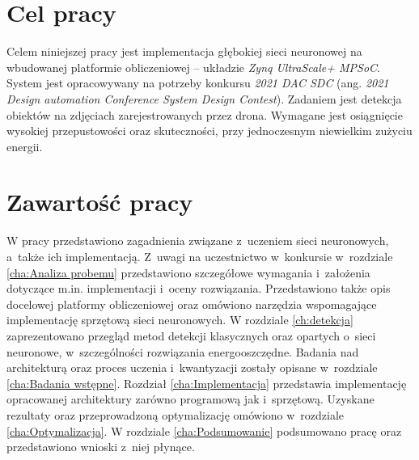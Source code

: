 \section{Cel pracy}
\label{sec:celePracy}
Celem niniejszej pracy jest implementacja głębokiej sieci neuronowej na wbudowanej platformie obliczeniowej -- układzie \emph{Zynq UltraScale+ MPSoC}.
System jest opracowywany na potrzeby konkursu \emph{2021 DAC SDC} (ang. \emph{ 2021 Design automation Conference System Design Contest}).
Zadaniem jest detekcja obiektów na zdjęciach zarejestrowanych przez drona. 
Wymagane jest osiągnięcie wysokiej przepustowości oraz skuteczności, przy jednoczesnym niewielkim zużyciu energii. 


\section{Zawartość pracy}
\label{sec:zawartoscPracy}
W pracy przedstawiono zagadnienia związane z~uczeniem sieci neuronowych, a~także ich implementacją. 
Z~uwagi na uczestnictwo w~konkursie w~rozdziale \ref{cha:Analiza probemu} przedstawiono szczegółowe wymagania i~założenia dotyczące m.in. implementacji i~oceny rozwiązania. 
Przedstawiono także opis docelowej platformy obliczeniowej oraz omówiono narzędzia wspomagające implementację sprzętową sieci neuronowych.
W rozdziale \ref{ch:detekcja} zaprezentowano przegląd metod detekcji klasycznych oraz opartych o~sieci neuronowe, w~szczególności rozwiązania energooszczędne.
Badania nad architekturą oraz proces uczenia i~kwantyzacji zostały opisane w~rozdziale \ref{cha:Badania wstępne}.
Rozdział \ref{cha:Implementacja} przedstawia implementację opracowanej architektury zarówno programową jak i~sprzętową. 
Uzyskane rezultaty oraz przeprowadzoną optymalizację omówiono w~rozdziale \ref{cha:Optymalizacja}. 
W rozdziale \ref{cha:Podsumowanie} podsumowano pracę oraz przedstawiono wnioski z~niej płynące. 

